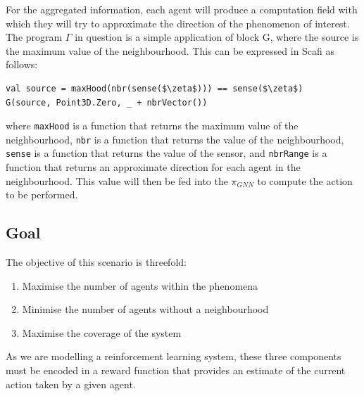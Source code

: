 \documentclass[conference]{IEEEtran}
\begin{document}
For the aggregated information, each agent will produce a computation field with which they will try to approximate the direction of the phenomenon of interest. 
%
%
The program $\Gamma$ in question is a simple application of block G, where the source is the maximum value of the neighbourhood. 
This can be expressed in Scafi as follows:
\begin{lstlisting}[mathescape=true]
val source = maxHood(nbr(sense($\zeta$))) == sense($\zeta$)
G(source, Point3D.Zero, _ + nbrVector())
\end{lstlisting}
where \texttt{maxHood} is a function that returns the maximum value of the neighbourhood, 
 \texttt{nbr} is a function that returns the value of the neighbourhood, 
\texttt{sense} is a function that returns the value of the sensor, and
\texttt{nbrRange} is a function that returns an approximate direction for each agent in the neighbourhood.
%
This value will then be fed into the $\pi_{GNN}$ to compute the action to be performed.

 
\subsection{Goal}
 The objective of this scenario is threefold:
\begin{enumerate}
\item Maximise the number of agents within the phenomena
\item Minimise the number of agents without a neighbourhood
\item Maximise the coverage of the system
\end{enumerate}
 
As we are modelling a reinforcement learning system, 
 these three components must be encoded in a reward function 
 that provides an estimate of the current action taken by a given agent.
 
\end{document}
